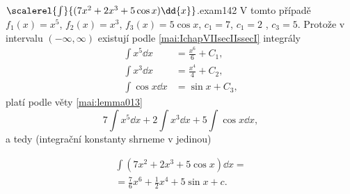 \begin{mathexam}{\(\protect\scalerel{\int}{(7x^2+2x^3+5\cos x)\dd{x}}\).}{exam142}
  V tomto případě \(f_1(x) = x^5\), \(f_2(x) = x^3\), \(f_3(x) = 5\cos x\), \(c_1=7\), \(c_1=2\) ,
  \(c_3=5\). Protože v intervalu \((-\infty, \infty)\) existují podle
  \eqref{mai:IchapVIIsecIIssecI} integrály
  \begin{align*}
    \int x^5\dd{x}   &= \frac{x^6}{6} + C_1, \\
    \int x^3\dd{x}   &= \frac{x^4}{4} + C_2, \\
    \int\cos x\dd{x} &= \sin x +C_3,
  \end{align*}
  platí podle věty \eqref{mai:lemma013} \[7\int x^5\dd{x} + 2\int x^3\dd{x} + 5\int\cos x\dd{x},\]
  a tedy (integrační konstanty shrneme v jedinou)
  \begin{fleqn}[0pt]
    \begin{multline*}
      \int(7x^2+2x^3+5\cos x)\dd{x} = \\
        = \frac{7}{6}x^6 + \frac{1}{2}x^4 + 5\sin x + c.
    \end{multline*}
  \end{fleqn}
\end{mathexam}